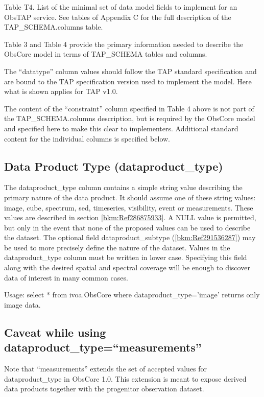 \documentclass[11pt,a4paper]{ivoa}
\begin{document}
\label{bkm:Ref286578377}Table T4. List of the minimal set of data model fields to
implement for an ObsTAP service. See tables of Appendix C for the full description of the TAP\_SCHEMA.columns table. 

Table 3 and Table 4 provide the primary information needed to describe the ObsCore model in terms of TAP\_SCHEMA tables
and columns. 

The ``datatype'' column values should follow the TAP standard specification and are bound to the TAP specification
version used to implement the model. Here what is shown applies for TAP v1.0. 

The content of the ``constraint'' column specified in Table 4 above is not part of the TAP\_SCHEMA.columns description,
but is required by the ObsCore model and specified here to make this clear to implementers.  Additional standard
content for the individual columns is specified below. 

\subsection{Data Product Type (dataproduct\_type)}
The dataproduct\_type column contains a simple string value describing the primary nature of the data product.  It
should assume one of these string values: image, cube, spectrum, sed, timeseries, visibility, event or measurements. 
These values are described in section \ref{bkm:Ref286875933}.  A NULL value is permitted, but only in the event that
none of the proposed values can be used to describe the dataset.  The optional field dataproduct\_subtype
(\ref{bkm:Ref291536287}) may be used to more precisely define the nature of the dataset.  Values in the
dataproduct\_type column must be written in lower case. Specifying this field along with the desired spatial and
spectral coverage will be enough to discover data of interest in many common cases. 

Usage: select * from ivoa.ObsCore where dataproduct\_type='image' returns only image data.

\subsection{ Caveat while using dataproduct\_type=``measurements''}
Note that ``measurements'' extends the set of accepted values for dataproduct\_type in ObsCore 1.0. This extension is
meant to expose derived data products together with the progenitor observation dataset. 
\end{document}
